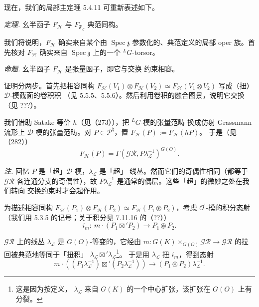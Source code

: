 现在，我们的局部主定理 5.4.11 可重新表述如下。

 \emph{定理.} 幺半函子 $F_{\mathcal{H}}$ 与
$F_{\mathfrak{F}_{\mathcal{L}}}$ 典范同构。

我们将说明，$F_{\mathcal{H}}$ 确实来自某个由 $\operatorname{Spec}\mathfrak{z}$
参数化的、典范定义的局部 oper 族。首先核对 $F_{\mathcal{H}}$ 确实来自
$\operatorname{Spec}\mathfrak{z}$ 上的一个 ${}^{L}G$-torsor。

 \emph{命题.} 幺半函子 $F_{\mathcal{H}}$ 是张量函子，即它与交换
约束相容。

证明分两步。首先把相容同构
$F_{\mathcal{H}}(V_1)\otimes F_{\mathcal{H}}(V_2)\simeq
F_{\mathcal{H}}(V_1\otimes V_2)$ 写成（扭）$\mathcal{D}$-模截面的卷积积
（见 5.5.5、5.5.6）。然后利用卷积的融合图景，说明它交换（见 ???）。

 我们借助 Satake 等价 $h$（见（273）），把 ${}^{L}G$-模的张量范畴
换成仿射 Grassmann 流形上 $\mathcal{D}$-模的张量范畴。对
$P\in\mathcal{P}^{\natural}$，置 $F_{\mathcal{H}}(P):=F_{\mathcal{H}}(hP)$。
于是（见（282））
\begin{equation}\tag{288}
F_{\mathcal{H}}(P)=\Gamma(\mathcal{GR},P\lambda_{\mathcal{L}}^{-1})^{G(O)}.
\end{equation}

\emph{注.} 回忆 $P$ 是「超」$\mathcal{D}$-模，$\lambda_{\mathcal{L}}$ 是「超」
线丛。然而它们的奇偶性相同（都等于 $\mathcal{GR}$ 各连通分支的奇偶性），故
$P\lambda_{\mathcal{L}}^{-1}$ 是通常的偶层。这些「超」的微妙之处在我们转向
交换约束时才会起作用。

为描述相容同构
$F_{\mathcal{H}}(P_1)\otimes F_{\mathcal{H}}(P_2)\simeq
F_{\mathcal{H}}(P_1\circledast P_2)$，考虑 $\mathcal{O}^{!}$-模的积分态射
（我们用 5.3.5 的记号；关于积分见 7.11.16 的（??））
\begin{equation}\tag{289}
i_m:\ m\cdot(P_1\boxtimes'P_2)\to P_1\circledast P_2.
\end{equation}


$\mathcal{GR}$ 上的线丛 $\lambda_{\mathcal{L}}$ 是 $G(O)$-等变的，它经由
$m:G(K)\times_{G(O)}\mathcal{GR}\to\mathcal{GR}$ 的拉回被典范地等同于「扭积」
$\lambda_{\mathcal{L}}\boxtimes'\lambda_{\mathcal{L}}$\footnote{这是因为按定义，
$\lambda_{\mathcal{L}}$ 来自 $G(K)$ 的一个中心扩张，该扩张在 $G(O)$ 上有分裂。}。
于是用 $\lambda_{\mathcal{L}}$ 扭 $i_m$，得到态射
\[
m\cdot((P_1\lambda_{\mathcal{L}}^{-1})\boxtimes'(P_2\lambda_{\mathcal{L}}^{-1}))
\to(P_1\circledast P_2)\lambda_{\mathcal{L}}^{-1}.
\]

